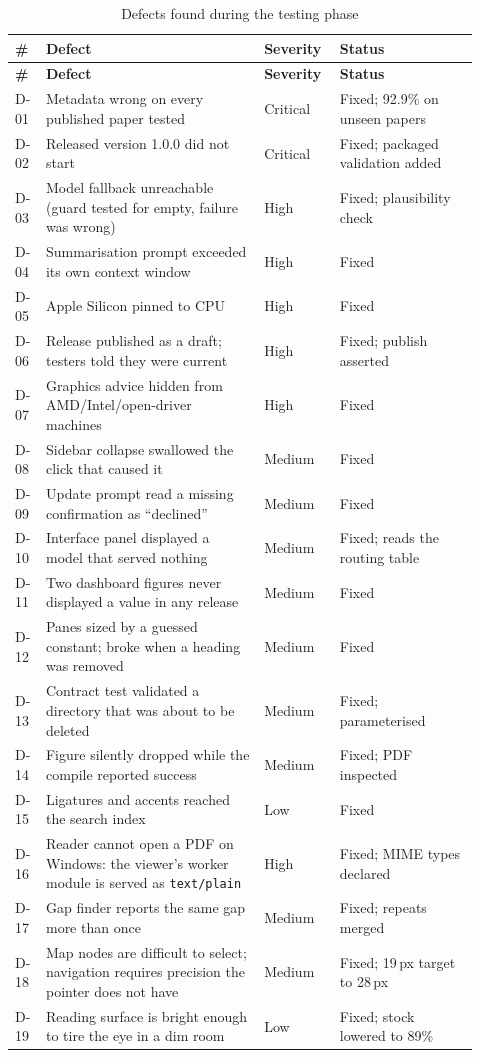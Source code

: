 \documentclass[12pt,a4paper]{report}
\begin{document}
\begin{longtable}{@{}p{0.05\linewidth}p{0.44\linewidth}p{0.14\linewidth}p{0.29\linewidth}@{}}
\caption{Defects found during the testing phase}\label{tab:defects}\\
\toprule
\textbf{\#} & \textbf{Defect} & \textbf{Severity} & \textbf{Status} \\
\midrule
\endfirsthead
\toprule
\textbf{\#} & \textbf{Defect} & \textbf{Severity} & \textbf{Status} \\
\midrule
\endhead

D-01 & Metadata wrong on every published paper tested & Critical & Fixed;
  92.9\% on unseen papers \\
D-02 & Released version 1.0.0 did not start & Critical & Fixed; packaged
  validation added \\
D-03 & Model fallback unreachable (guard tested for empty, failure was wrong)
  & High & Fixed; plausibility check \\
D-04 & Summarisation prompt exceeded its own context window & High & Fixed \\
D-05 & Apple Silicon pinned to CPU & High & Fixed \\
D-06 & Release published as a draft; testers told they were current & High &
  Fixed; publish asserted \\
D-07 & Graphics advice hidden from AMD/Intel/open-driver machines & High &
  Fixed \\
D-08 & Sidebar collapse swallowed the click that caused it & Medium & Fixed \\
D-09 & Update prompt read a missing confirmation as ``declined'' & Medium &
  Fixed \\
D-10 & Interface panel displayed a model that served nothing & Medium & Fixed;
  reads the routing table \\
D-11 & Two dashboard figures never displayed a value in any release & Medium &
  Fixed \\
D-12 & Panes sized by a guessed constant; broke when a heading was removed &
  Medium & Fixed \\
D-13 & Contract test validated a directory that was about to be deleted &
  Medium & Fixed; parameterised \\
D-14 & Figure silently dropped while the compile reported success & Medium &
  Fixed; PDF inspected \\
D-15 & Ligatures and accents reached the search index & Low & Fixed \\
\addlinespace
D-16 & Reader cannot open a PDF on Windows: the viewer's worker module is
  served as \texttt{text/plain} & High & Fixed; MIME types declared \\
D-17 & Gap finder reports the same gap more than once & Medium & Fixed;
  repeats merged \\
D-18 & Map nodes are difficult to select; navigation requires precision the
  pointer does not have & Medium & Fixed; 19\,px target to 28\,px \\
D-19 & Reading surface is bright enough to tire the eye in a dim room & Low &
  Fixed; stock lowered to 89\% \\
\bottomrule
\end{longtable}
\end{document}
